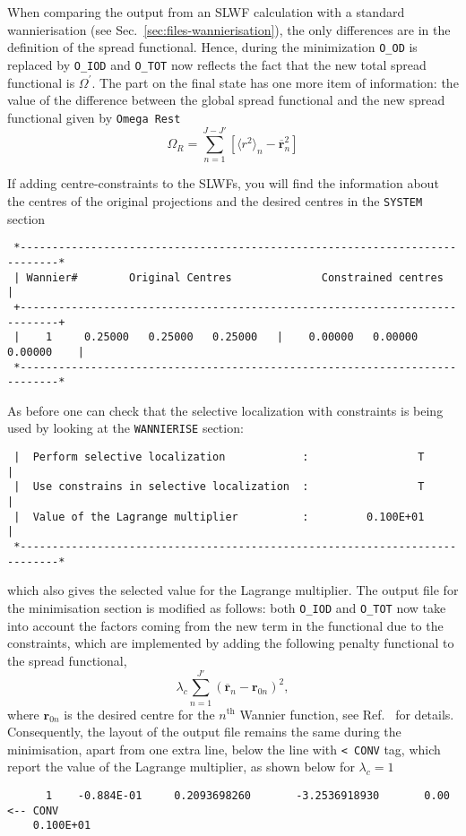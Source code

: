 When comparing the output from an SLWF calculation with a standard 
wannierisation (see Sec.~\ref{sec:files-wannierisation}), the only differences are in the definition of
 the spread functional. Hence, during the minimization \texttt{O\_OD} is replaced by \texttt{O\_IOD}
and \texttt{O\_TOT} now reflects the fact that the new total spread
functional is $\Omega^{'}$.    
The part on the final state has one more item of information: the value of the difference
between the global spread functional and the new spread functional given by 
\texttt{Omega Rest}
$$\Omega_{R} = \sum_{n=1}^{J-J'} \left[\langle r^2 \rangle_n - \overline{\mathbf{r}}_{n}^{2} \right]$$

If adding centre-constraints to the SLWFs,
you will find the information about the centres of the original projections and 
the desired centres in the {\tt SYSTEM} section
\begin{verbatim}
 *----------------------------------------------------------------------------*
 | Wannier#        Original Centres              Constrained centres          |
 +----------------------------------------------------------------------------+
 |    1     0.25000   0.25000   0.25000   |    0.00000   0.00000   0.00000    |
 *----------------------------------------------------------------------------*
\end{verbatim}
As before one can check that the selective localization with constraints is being used by
looking at the {\tt WANNIERISE} section:
\begin{verbatim}
 |  Perform selective localization            :                 T             |
 |  Use constrains in selective localization  :                 T             |
 |  Value of the Lagrange multiplier          :         0.100E+01             |
 *----------------------------------------------------------------------------*
\end{verbatim}
which also gives the selected value for the Lagrange multiplier.
The output file for the minimisation section is modified as follows: 
both {\tt O\_IOD} and {\tt O\_TOT} now take into account
the factors coming from the new term in the functional due to the constraints,
which are implemented by adding the following penalty functional to the spread functional,
$$\lambda_c \sum_{n=1}^{J'} \left(\overline{\mathbf{r}}_n - \mathbf{r}_{0n} \right)^2,$$
where $\mathbf{r}_{0n}$ is the desired centre for the $n^{\text{th}}$ Wannier function, see Ref.~\cite{Marianetti} for details.
Consequently, the layout of the output file remains the same during the minimisation,
apart from one extra line, below the line with {\tt <\-\- CONV} tag, which report the value
of the Lagrange multiplier, as shown below for $\lambda_c = 1$
\begin{verbatim}
      1    -0.884E-01     0.2093698260       -3.2536918930       0.00  <-- CONV
    0.100E+01
\end{verbatim}

